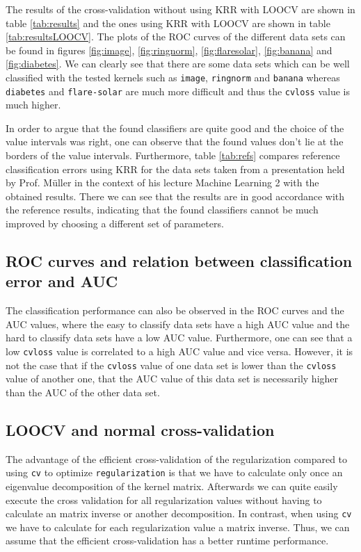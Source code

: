 \documentclass[a4paper, 11pt, titlepage]{article}
\begin{document}
The results of the cross-validation without using KRR with LOOCV are shown in table \ref{tab:results} and the ones using KRR with LOOCV are shown in table \ref{tab:resultsLOOCV}.
The plots of the ROC curves of the different data sets can be found in figures \ref{fig:image}, \ref{fig:ringnorm}, \ref{fig:flaresolar}, \ref{fig:banana} and \ref{fig:diabetes}.
We can clearly see that there are some data sets which can be well classified with the tested kernels such as \texttt{image}, \texttt{ringnorm} and \texttt{banana} whereas \texttt{diabetes} and \texttt{flare-solar} are much more difficult and thus the \texttt{cvloss} value is much higher.

In order to argue that the found classifiers are quite good and the choice of the value intervals was right, one can observe that the found values don't lie at the borders of the value intervals.
Furthermore, table \ref{tab:refs} compares reference classification errors using KRR for the data sets taken from a presentation held by Prof. M\"uller \cite{Mueller13} in the context of his lecture Machine Learning 2 with the obtained results.
There we can see that the results are in good accordance with the reference results, indicating that the found classifiers cannot be much improved by choosing a different set of parameters.

\setcounter{section}{4}

\subsection{ROC curves and relation between classification error and AUC}

The classification performance can also be observed in the ROC curves and the AUC values, where the easy to classify data sets have a high AUC value and the hard to classify data sets have a low AUC value.
Furthermore, one can see that a low \texttt{cvloss} value is correlated to a high AUC value and vice versa.
However, it is not the case that if the \texttt{cvloss} value of one data set is lower than the \texttt{cvloss} value of another one, that the AUC value of this data set is necessarily higher than the AUC of the other data set.

\subsection{LOOCV and normal cross-validation}

The advantage of the efficient cross-validation of the regularization compared to using \texttt{cv} to optimize \texttt{regularization} is that we have to calculate only once an eigenvalue decomposition of the kernel matrix.
Afterwards we can quite easily execute the cross validation for all regularization values without having to calculate an matrix inverse or another decomposition.
In contrast, when using \texttt{cv} we have to calculate for each regularization value a matrix inverse.
Thus, we can assume that the efficient cross-validation has a better runtime performance.
\end{document}
